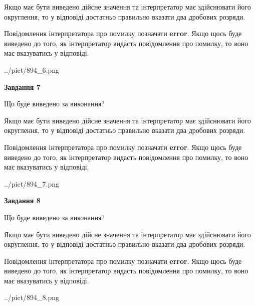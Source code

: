 \documentclass[12pt, ukrainian]{article}
\begin{document}
{\begin {Large}
Якщо має бути виведено дійсне значення та інтерпретатор має здійснювати його округлення, 
то у відповіді достатньо правильно вказати два дробових розряди.

Повідомлення інтерпретатора про помилку позначати \textbf{error}.
Якщо щось буде виведено до того, як інтерпретатор видасть повідомлення про помилку, 
то воно має вказуватись у відповіді. \par

\begin{center}
	{../pict/894_6.png}
\end{center}
\newpage

{\begin {center}\textbf{Завдання 7}\end {center}}\par
Що буде виведено за виконання? \par

Якщо має бути виведено дійсне значення та інтерпретатор має здійснювати його округлення, 
то у відповіді достатньо правильно вказати два дробових розряди.

Повідомлення інтерпретатора про помилку позначати \textbf{error}.
Якщо щось буде виведено до того, як інтерпретатор видасть повідомлення про помилку, 
то воно має вказуватись у відповіді. \par

\begin{center}
	{../pict/894_7.png}
\end{center}
\newpage

{\begin {center}\textbf{Завдання 8}\end {center}}\par
Що буде виведено за виконання? \par

Якщо має бути виведено дійсне значення та інтерпретатор має здійснювати його округлення, 
то у відповіді достатньо правильно вказати два дробових розряди.

Повідомлення інтерпретатора про помилку позначати \textbf{error}.
Якщо щось буде виведено до того, як інтерпретатор видасть повідомлення про помилку, 
то воно має вказуватись у відповіді. \par

\begin{center}
	{../pict/894_8.png}
\end{center}
\newpage


\end{Large}}
\end{document}
